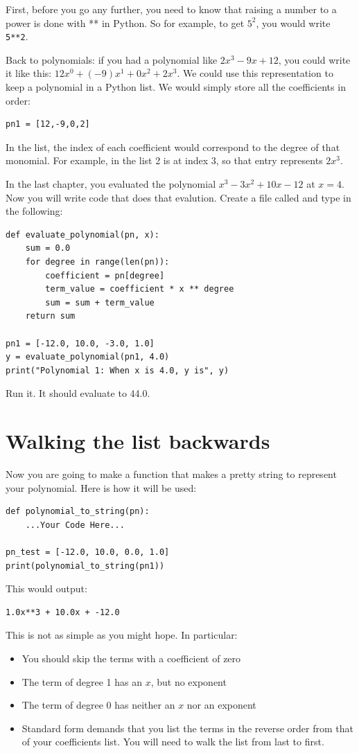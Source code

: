 First, before you go any further, you need to know that raising a
number to a power is done with ** in Python.  So for example, to get
$5^2$, you would write \texttt{5**2}.

Back to polynomials: if you had a polynomial like $2x^3 -9x + 12$, you
could write it like this: $12x^0 + (-9)x^1 + 0x^2 + 2x^3$.  We could
use this representation to keep a polynomial in a Python list. We
would simply store all the coefficients in order:
\begin{Verbatim}
pn1 = [12,-9,0,2]
\end{Verbatim}

In the list, the index of each coefficient would correspond to the
degree of that monomial. For example, in the list 2 is at index 3, so
that entry represents $2x^3$.

In the last chapter, you evaluated the polynomial $x^3 - 3x^2 + 10x -
12$ at $x=4$. Now you will write code that does that evalution.
Create a file called  and type in the following:

\begin{Verbatim}
def evaluate_polynomial(pn, x):
    sum = 0.0  
    for degree in range(len(pn)):
        coefficient = pn[degree]
        term_value = coefficient * x ** degree
        sum = sum + term_value
    return sum
   
pn1 = [-12.0, 10.0, -3.0, 1.0]
y = evaluate_polynomial(pn1, 4.0)
print("Polynomial 1: When x is 4.0, y is", y)
\end{Verbatim}

Run it. It should evaluate to 44.0.

\section{Walking the list backwards}

Now you are going to make a function that makes a pretty string to
represent your polynomial. Here is how it will be used:
\begin{Verbatim}
def polynomial_to_string(pn):
    ...Your Code Here...

pn_test = [-12.0, 10.0, 0.0, 1.0]
print(polynomial_to_string(pn1))
\end{Verbatim}

This would output:
\begin{Verbatim}
1.0x**3 + 10.0x + -12.0
\end{Verbatim}
This is not as simple as you might hope. In particular:
\begin{itemize}
\item You should skip the terms with a coefficient of zero
\item The term of degree 1 has an $x$, but no exponent
\item The term of degree 0 has neither an $x$ nor an exponent
\item Standard form demands that you list the terms in the reverse
  order from that of your coefficients list. You will need to walk the
  list from last to first.
\end{itemize}

